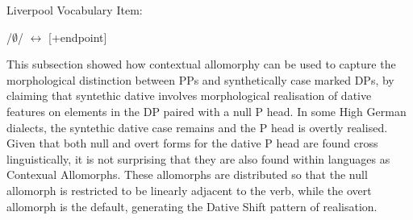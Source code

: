 	\begin{exe}
		\ex Liverpool Vocabulary Item: \label{ex:livervi}
		\begin{xlist}
			\ex /$\emptyset$/ $\leftrightarrow$ [+endpoint]
		\end{xlist}
	\end{exe}

	This subsection showed how contextual allomorphy can be used to capture the morphological distinction between PPs and synthetically case marked DPs, by claiming that syntethic dative involves morphological realisation of dative features on elements in the DP paired with a null P head. In some High German dialects, the syntethic dative case remains and the P head is overtly realised. Given that both null and overt forms for the dative P head are found cross linguistically, it is not surprising that they are also found within languages as Contexual Allomorphs. These allomorphs are distributed so that the null allomorph is restricted to be linearly adjacent to the verb, while the overt allomorph is the default, generating the Dative Shift pattern of realisation.

